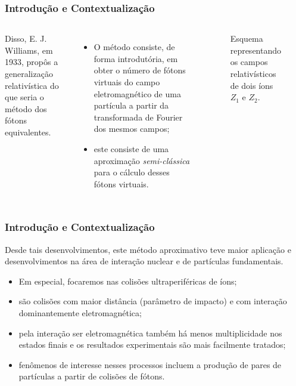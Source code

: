 \documentclass[xcolor=dvipsnames]{beamer}
\begin{document}
\begin{frame}
	\frametitle{Introdução e Contextualização}

	\begin{columns}

	Disso, E. J. Williams, em 1933, propôs a generalização relativística do que
	seria o método dos fótons equivalentes.
	\begin{itemize}
		\item O método consiste, de forma introdutória, em obter o número de 
			fótons virtuais do campo eletromagnético de uma partícula a
			partir da transformada de Fourier dos mesmos campos;
		\item este consiste de uma aproximação \textit{semi-clássica} para
			o cálculo desses fótons virtuais.
	\end{itemize}


	\begin{figure}
		
		\caption{Esquema representando os campos relativísticos de dois íons
		$Z_1$ e $Z_2$.}
	\end{figure}


	\end{columns}
\end{frame}

\begin{frame}
	\frametitle{Introdução e Contextualização}

	Desde tais desenvolvimentos, este método aproximativo teve maior aplicação e
	desenvolvimentos na área de interação nuclear e de partículas fundamentais.

	\begin{itemize}
		\item Em especial, focaremos nas colisões ultraperiféricas de íons;
		\item são colisões com maior distância (parâmetro de impacto) e com
			interação dominantemente eletromagnética;
		\item pela interação ser eletromagnética também há menos multiplicidade
			nos estados finais e os resultados experimentais são mais facilmente
			tratados;
		\item fenômenos de interesse nesses processos incluem a produção de
			pares de partículas a partir de colisões de fótons.
	\end{itemize}
\end{frame}
\end{document}
